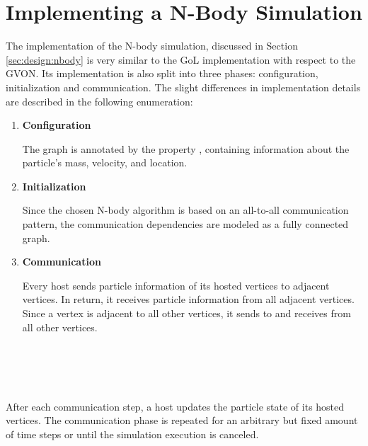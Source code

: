 \section{Implementing a N-Body Simulation}
\label{sec:impl:nbody}


The implementation of the N-body simulation, discussed in Section
\ref{sec:design:nbody} is very similar to the GoL
implementation with respect to the GVON. Its implementation is
also split into three phases: configuration, initialization and
communication. The slight differences in implementation details are
described in the following enumeration:

\begin{minipage}[t]{\textwidth} 
\begin{enumerate}
\item \textbf{Configuration}

  The graph is annotated by the property , containing
  information about the particle's mass, velocity, and location.

\item \textbf{Initialization}

  Since the chosen N-body algorithm is
  based on an all-to-all communication pattern, the communication
  dependencies are modeled as a fully connected graph.

\item \textbf{Communication}

  Every host sends particle information
  of its hosted vertices to adjacent vertices. In return, it receives
  particle information from all adjacent vertices. Since a vertex is
  adjacent to all other vertices, it sends to and receives from
  all other vertices.
\end{enumerate}
\end{minipage}
\\
\\
\\
\\
\noindent After each communication step, a host updates the particle
state of its hosted vertices.  The communication phase is repeated for
an arbitrary but fixed amount of time steps or until the simulation
execution is canceled.

